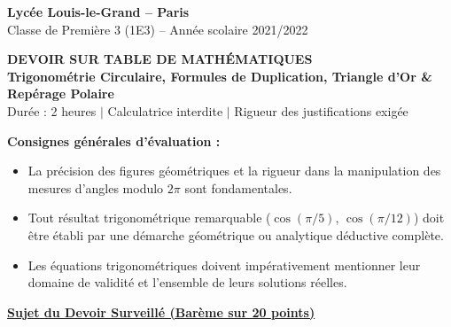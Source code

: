 \documentclass[11pt,a4paper]{article}
\begin{document}
\begin{center}
    {\LARGE \bfseries Lycée Louis-le-Grand -- Paris}\\[0.2cm]
    {\large Classe de Première 3 (1E3) -- Année scolaire 2021/2022}\\[0.3cm]
    \begin{tcolorbox}[colback=llglight,colframe=llgblue,arc=3mm,boxrule=1.2pt,center]
        \begin{center}
            {\Large \bfseries \color{llgblue} DEVOIR SUR TABLE DE MATHÉMATIQUES}\\[0.15cm]
            {\large \bfseries Trigonométrie Circulaire, Formules de Duplication, Triangle d'Or \& Repérage Polaire}\\[0.2cm]
            \small Durée : 2 heures \quad $\vert$ \quad Calculatrice interdite \quad $\vert$ \quad Rigueur des justifications exigée
        \end{center}
    \end{tcolorbox}
\end{center}

\vspace{0.3cm}

\begin{tcolorbox}[colback=white,colframe=llgblue!60,arc=1.5mm,boxrule=0.6pt]
\small\textbf{Consignes générales d'évaluation :}
\begin{itemize}[leftmargin=*,itemsep=1pt]
    \item La précision des figures géométriques et la rigueur dans la manipulation des mesures d'angles modulo $2\pi$ sont fondamentales.
    \item Tout résultat trigonométrique remarquable ($\cos(\pi/5)$, $\cos(\pi/12)$) doit être établi par une démarche géométrique ou analytique déductive complète.
    \item Les équations trigonométriques doivent impérativement mentionner leur domaine de validité et l'ensemble de leurs solutions réelles.
\end{itemize}
\end{tcolorbox}

\vspace{0.4cm}

\begin{center}
    {\Large \bfseries \color{llgblue} \underline{Sujet du Devoir Surveillé (Barème sur 20 points)}}
\end{center}
\end{document}
